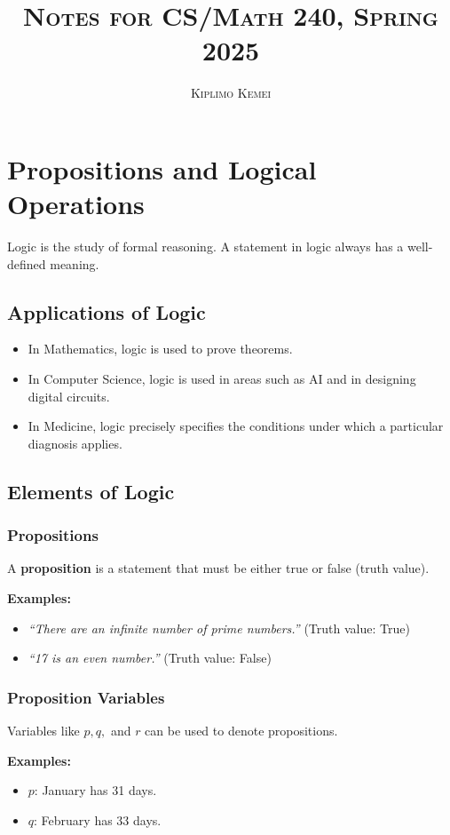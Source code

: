 \documentclass{article}
\title{\textsc{Notes for CS/Math 240, Spring 2025}}
\author{\textsc{Kiplimo Kemei}}
\begin{document}
\maketitle

\section{Propositions and Logical Operations}
Logic is the study of formal reasoning. A statement in logic always has a well-defined meaning.

\subsection{Applications of Logic}
\begin{itemize}
    \item In Mathematics, logic is used to prove theorems.
    \item In Computer Science, logic is used in areas such as AI and in designing digital circuits.
    \item In Medicine, logic precisely specifies the conditions under which a particular diagnosis applies.
\end{itemize}

\subsection{Elements of Logic}

\subsubsection{Propositions}
A \textbf{proposition} is a statement that must be either true or false (truth value).

\textbf{Examples:}
\begin{itemize}
    \item \textit{``There are an infinite number of prime numbers.''} \quad (Truth value: True)
    \item \textit{``17 is an even number.''} \quad (Truth value: False)
\end{itemize}

\subsubsection{Proposition Variables}
Variables like $p, q,$ and $r$ can be used to denote propositions.

\textbf{Examples:}
\begin{itemize}
    \item $p$: January has 31 days.
    \item $q$: February has 33 days.
\end{itemize}
\end{document}
